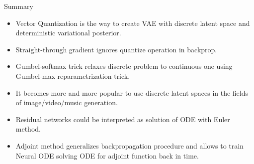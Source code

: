\begin{frame}{Summary}
	\begin{itemize}
		\item Vector Quantization is the way to create VAE with discrete latent space and deterministic variational posterior. 
		\vfill
		\item Straight-through gradient ignores quantize operation in backprop.
		\vfill
		\item Gumbel-softmax trick relaxes discrete problem to continuous one using Gumbel-max reparametrization trick.
		\vfill
		\item It becomes more and more popular to use discrete latent spaces in the fields of image/video/music generation.
		\vfill		
		\item Residual networks could be interpreted as solution of ODE with Euler method.
		\vfill
		\item Adjoint method generalizes backpropagation procedure and allows to train Neural ODE solving ODE for adjoint function back in time.
	\end{itemize}
\end{frame}
 